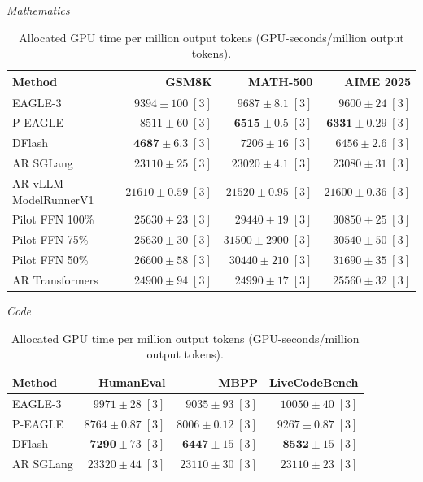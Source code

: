 \documentclass[conference,onecolumn]{IEEEtran}
\begin{document}
\begin{table}[!tp]
\centering
\small
\setlength{\tabcolsep}{3pt}
\caption{Allocated GPU time per million output tokens (GPU-seconds/million output tokens).}
\label{tab:gpu-time}
\textit{Mathematics}\par\smallskip
\begin{tabular}{@{}>{\raggedright\arraybackslash}p{3.7cm}rrr@{}}
\toprule
Method & GSM8K & MATH-500 & AIME 2025 \\
\midrule
EAGLE-3 & \(9394 \pm 100\;[3]\) & \(9687 \pm 8.1\;[3]\) & \(9600 \pm 24\;[3]\) \\
P-EAGLE & \(8511 \pm 60\;[3]\) & \(\mathbf{6515} \pm 0.5\;[3]\) & \(\mathbf{6331} \pm 0.29\;[3]\) \\
DFlash & \(\mathbf{4687} \pm 6.3\;[3]\) & \(7206 \pm 16\;[3]\) & \(6456 \pm 2.6\;[3]\) \\
AR \textperiodcentered{} SGLang & \(23110 \pm 25\;[3]\) & \(23020 \pm 4.1\;[3]\) & \(23080 \pm 31\;[3]\) \\
AR \textperiodcentered{} vLLM ModelRunnerV1 & \(21610 \pm 0.59\;[3]\) & \(21520 \pm 0.95\;[3]\) & \(21600 \pm 0.36\;[3]\) \\
Pilot FFN 100\% & \(25630 \pm 23\;[3]\) & \(29440 \pm 19\;[3]\) & \(30850 \pm 25\;[3]\) \\
Pilot FFN 75\% & \(25630 \pm 30\;[3]\) & \(31500 \pm 2900\;[3]\) & \(30540 \pm 50\;[3]\) \\
Pilot FFN 50\% & \(26600 \pm 58\;[3]\) & \(30440 \pm 210\;[3]\) & \(31690 \pm 35\;[3]\) \\
AR \textperiodcentered{} Transformers & \(24900 \pm 94\;[3]\) & \(24990 \pm 17\;[3]\) & \(25560 \pm 32\;[3]\) \\
\bottomrule
\end{tabular}
\par\medskip
\textit{Code}\par\smallskip
\begin{tabular}{@{}>{\raggedright\arraybackslash}p{3.7cm}rrr@{}}
\toprule
Method & HumanEval & MBPP & LiveCodeBench \\
\midrule
EAGLE-3 & \(9971 \pm 28\;[3]\) & \(9035 \pm 93\;[3]\) & \(10050 \pm 40\;[3]\) \\
P-EAGLE & \(8764 \pm 0.87\;[3]\) & \(8006 \pm 0.12\;[3]\) & \(9267 \pm 0.87\;[3]\) \\
DFlash & \(\mathbf{7290} \pm 73\;[3]\) & \(\mathbf{6447} \pm 15\;[3]\) & \(\mathbf{8532} \pm 15\;[3]\) \\
AR \textperiodcentered{} SGLang & \(23320 \pm 44\;[3]\) & \(23110 \pm 30\;[3]\) & \(23110 \pm 23\;[3]\) \\

\end{tabular}
\end{table}
\end{document}
